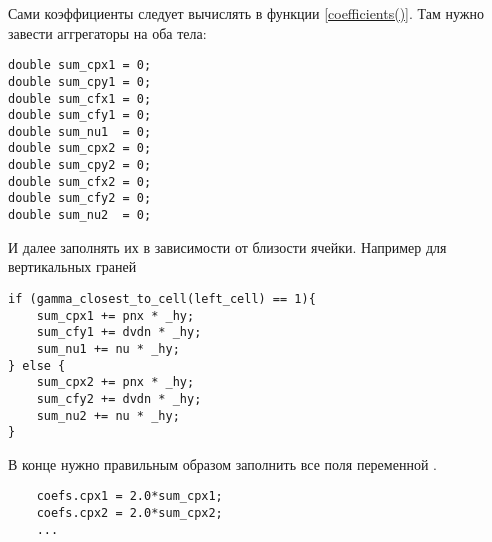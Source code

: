 Сами коэффициенты следует вычислять в функции \cref{coefficients()}.
Там нужно завести аггрегаторы на оба тела:
\begin{verbatim}
double sum_cpx1 = 0;
double sum_cpy1 = 0;
double sum_cfx1 = 0;
double sum_cfy1 = 0;
double sum_nu1  = 0;
double sum_cpx2 = 0;
double sum_cpy2 = 0;
double sum_cfx2 = 0;
double sum_cfy2 = 0;
double sum_nu2  = 0;
\end{verbatim}

И далее заполнять их в зависимости от близости ячейки. Например для вертикальных граней
\begin{verbatim}
if (gamma_closest_to_cell(left_cell) == 1){
	sum_cpx1 += pnx * _hy;
	sum_cfy1 += dvdn * _hy;
	sum_nu1 += nu * _hy;
} else {
	sum_cpx2 += pnx * _hy;
	sum_cfy2 += dvdn * _hy;
	sum_nu2 += nu * _hy;
}
\end{verbatim}

В конце нужно правильным образом заполнить все поля
переменной .
\begin{verbatim}
	coefs.cpx1 = 2.0*sum_cpx1;
	coefs.cpx2 = 2.0*sum_cpx2;
	...
\end{verbatim}
